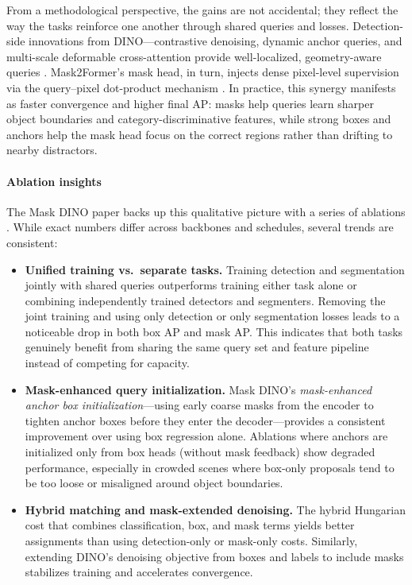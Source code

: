 \begin{enrichment}
\begin{enrichment}
		From a methodological perspective, the gains are not accidental; they reflect the way the tasks reinforce one another through shared queries and losses. Detection-side innovations from DINO—contrastive denoising, dynamic anchor queries, and multi-scale deformable cross-attention provide well-localized, geometry-aware queries \cite{zhang2022_dino}. Mask2Former’s mask head, in turn, injects dense pixel-level supervision via the query–pixel dot-product mechanism \cite{ke2023_hqsam}. In practice, this synergy manifests as faster convergence and higher final AP: masks help queries learn sharper object boundaries and category-discriminative features, while strong boxes and anchors help the mask head focus on the correct regions rather than drifting to nearby distractors.
		
		\paragraph{Ablation insights}
		
		The Mask DINO paper backs up this qualitative picture with a series of ablations \cite{li2022_maskdino}. While exact numbers differ across backbones and schedules, several trends are consistent:
		
		\begin{itemize}
			\item \textbf{Unified training vs.\ separate tasks.} Training detection and segmentation jointly with shared queries outperforms training either task alone or combining independently trained detectors and segmenters. Removing the joint training and using only detection or only segmentation losses leads to a noticeable drop in both box AP and mask AP. This indicates that both tasks genuinely benefit from sharing the same query set and feature pipeline instead of competing for capacity.
			\item \textbf{Mask-enhanced query initialization.} Mask DINO’s \emph{mask-enhanced anchor box initialization}—using early coarse masks from the encoder to tighten anchor boxes before they enter the decoder—provides a consistent improvement over using box regression alone. Ablations where anchors are initialized only from box heads (without mask feedback) show degraded performance, especially in crowded scenes where box-only proposals tend to be too loose or misaligned around object boundaries.
			\item \textbf{Hybrid matching and mask-extended denoising.} The hybrid Hungarian cost that combines classification, box, and mask terms yields better assignments than using detection-only or mask-only costs. Similarly, extending DINO’s denoising objective from boxes and labels to include masks stabilizes training and accelerates convergence. 
			

\end{itemize}
\end{enrichment}
\end{enrichment}
